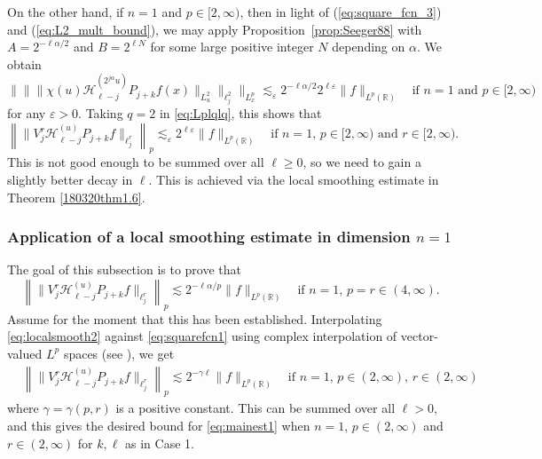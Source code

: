 \documentclass[12pt,leqno]{amsart}
\def\R{\mathbb{R}}
\theoremstyle{plain}
\numberwithin{equation}{section}
\begin{document}
On the other hand, if $n = 1$ and $p \in [2,\infty)$, then in light of (\ref{eq:square_fcn_3}) and (\ref{eq:L2_mult_bound}), we may apply Proposition~\ref{prop:Seeger88} with $A = 2^{-\ell \alpha/2}$ and $B = 2^{\ell N}$ for some large positive integer $N$ depending on $\alpha$. We obtain
\[ 
\| \| \| \chi(u) \mathcal{H}^{(2^{j \alpha} u)}_{\ell-j} P_{j+k} f (x) \|_{L^2_u} \|_{\ell^2_j} \|_{L^p_x} \lesssim_{\varepsilon}  2^{-\ell \alpha/2} 2^{\ell \varepsilon} \|f\|_{L^p(\R)} \quad \text{if $n = 1$ and $p  \in [2,\infty)$}
\]
for any $\varepsilon > 0$. Taking $q = 2$ in \eqref{eq:Lplqlq}, this shows that
\begin{equation} \label{eq:squarefcn1}
\left\| \|V_j^{r} \mathcal{H}^{(u)}_{\ell-j} P_{j+k} f \|_{\ell^r_j} \right\|_p \lesssim_{\varepsilon} 2^{\ell \varepsilon} \|f\|_{L^p(\R)} \quad \text{if $n = 1$, $p \in [2,\infty)$ and $r \in [2,\infty)$}.
\end{equation}
This is not good enough to be summed over all $\ell \geq 0$, so we need to gain a slightly better decay in $\ell$. This is achieved via the local smoothing estimate in Theorem \ref{180320thm1.6}.

\subsubsection{Application of a local smoothing estimate in dimension $n = 1$}
The goal of this subsection is to prove that 
\begin{equation} \label{eq:localsmooth2}
\left\| \|V_j^{r} \mathcal{H}^{(u)}_{\ell-j} P_{j+k} f \|_{\ell^r_j} \right\|_p  \lesssim 2^{-\ell \alpha/p} \|f\|_{L^p(\R)} \quad \text{if $n = 1$, $p = r \in (4,\infty)$}.
\end{equation}
Assume for the moment that this has been established. Interpolating \eqref{eq:localsmooth2} against \eqref{eq:squarefcn1} using complex interpolation of vector-valued $L^p$ spaces (see \cite[Theorem 5.1.2]{BL76}), we get
\begin{equation} \label{eq:eachpiece}
\begin{split}
&\left\| \|V_j^{r} \mathcal{H}^{(u)}_{\ell-j} P_{j+k} f \|_{\ell^r_j} \right\|_p  \lesssim 2^{-\gamma \ell} \|f\|_{L^p(\R)} \quad \text{if $n = 1$, $p \in (2,\infty)$, $r \in (2,\infty)$}
\end{split}
\end{equation}
where $\gamma = \gamma(p,r)$ is a positive constant. This can be summed over all $\ell > 0$, and this gives the desired bound for \eqref{eq:mainest1} when $n = 1$, $p \in (2,\infty)$ and $r \in (2,\infty)$ for $k, \ell$ as in Case 1.
\end{document}

